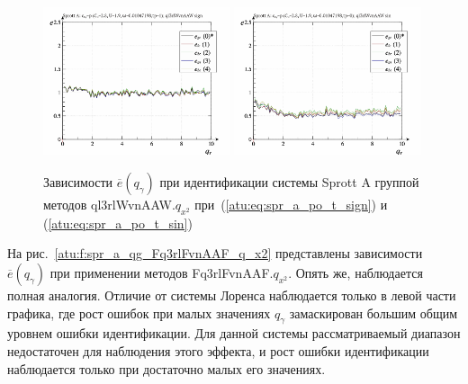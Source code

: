 \begin{figure}[htb!]
  \centerline{
    \includegraphics[width=0.49\textwidth]{p/cha/spr_a/ql3rlWvnAAW_x2/sprott_a_id-p_q_gamma_sign.png}
    \hfill
    \includegraphics[width=0.49\textwidth]{p/cha/spr_a/ql3rlWvnAAW_x2/sprott_a_id-p_q_gamma_sin.png}
  }
  \caption{Зависимости $\overline{e}(q_\gamma)$ при идентификации системы Sprott A группой методов ql3rlWvnAAW.$q_{x^2}$
   при~(\ref{atu:eq:spr_a_po_t_sign}) и (\ref{atu:eq:spr_a_po_t_sin})}
  \label{atu:f:spr_a_ql3rlWvnAAW_q_x2}
\end{figure}

На рис.~\ref{atu:f:spr_a_qg_Fq3rlFvnAAF_q_x2} представлены зависимости
$\overline{e}(q_\gamma)$ при применении методов Fq3rlFvnAAF.$q_{x^2}$.
Опять же, наблюдается полная аналогия. Отличие от системы Лоренса наблюдается только
в левой части графика, где рост ошибок при
малых значениях $q_\gamma$ замаскирован большим общим уровнем ошибки идентификации.
Для данной системы рассматриваемый диапазон недостаточен для наблюдения этого эффекта,
и рост ошибки идентификации наблюдается только при достаточно малых его значениях.

